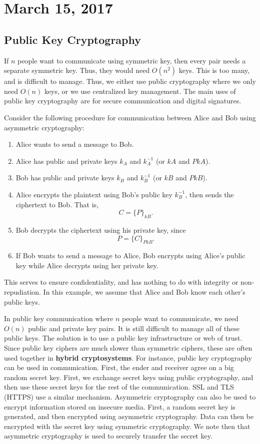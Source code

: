 \documentclass[11pt]{article}
\theoremstyle{plain} %
\theoremstyle{definition}
\theoremstyle{example}
\theoremstyle{remark}
\begin{document}
\section{March 15, 2017}
\subsection{Public Key Cryptography}
If $n$ people want to communicate using symmetric key, then every pair needs a separate symmetric key. Thus, they would need $O(n^2)$ keys. This is too many, and is difficult to manage. Thus, we either use public cryptography where we only need $O(n)$ keys, or we use centralized key management. The main uses of public key cryptography are for secure communication and digital signatures. 

Consider the following procedure for communication between Alice and Bob using asymmetric cryptography:
\begin{enumerate}
	\item Alice wants to send a message to Bob.
	\item Alice has public and private keys $k_A$ and $k_A^{-1}$ (or $kA$ and $PkA$). 
	\item Bob has public and private keys $k_B$ and $k_B^{-1}$ (or $kB$ and $PkB$). 
	\item Alice encrypts the plaintext using Bob's public key $k_B^{-1}$, then sends the ciphertext to Bob. That is, $$C= \{P\}_{kB}.$$
	\item Bob decrypts the ciphertext using his private key, since 
	$$P = \{C\}_{PkB}.$$
	\item If Bob wants to send a message to Alice, Bob encrypts using Alice's public key while Alice decrypts using her private key. 
\end{enumerate}
This serves to ensure confidentiality, and has nothing to do with integrity or non-repudiation. In this example, we assume that Alice and Bob know each other's public keys. 

In public key communication where $n$ people want to communicate, we need $O(n)$ public and private key pairs. It is still difficult to manage all of these public keys. The solution is to use a public key infrastructure or web of trust. Since public key ciphers are much slower than symmetric ciphers, these are often used together in \textbf{hybrid cryptosystems}. For instance, public key cryptography can be used in communication. First, the ender and receiver agree on a big random secret key. First, we exchange secret keys using public cryptography, and then use these secret keys for the rest of the communication. SSL and TLS (HTTPS) use a similar mechanism. Asymmetric cryptography can also be used to encrypt information stored on insecure media. First, a random secret key is generated, and then encrypted using asymmetric cryptography. Data can then be encrypted with the secret key using symmetric cryptography. We note then that asymmetric cryptography is used to securely transfer the secret key. 
\end{document}
